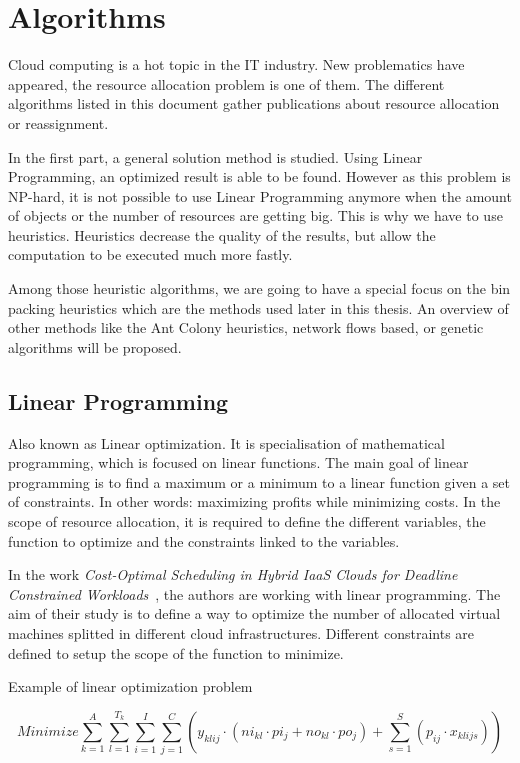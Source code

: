 \section{Algorithms}

Cloud computing is a hot topic in the IT industry.  New problematics have
appeared, the resource allocation problem is one of them. The different
algorithms listed in this document gather publications about resource
allocation or reassignment.

In the first part, a general solution method is studied. Using Linear
Programming, an optimized result is able to be found. However as this problem
is NP-hard, it is not possible to use Linear Programming anymore when the
amount of objects or the number of resources are getting big. This is why we
have to use heuristics. Heuristics decrease the quality of the results, but
allow the computation to be executed much more fastly.

Among those heuristic algorithms, we are going to have a special focus on the
bin packing heuristics which are the methods used later in this thesis. An
overview of other methods like the Ant Colony heuristics, network flows
based, or genetic algorithms will be proposed.

\subsection{Linear Programming}

Also known as Linear optimization. It is specialisation of mathematical
programming, which is focused on linear functions. The main goal of linear
programming is to find a maximum or a minimum to a linear function given a set
of constraints. In other words: maximizing profits while minimizing costs. In
the scope of resource allocation, it is required to define the different
variables, the function to optimize and the constraints linked to the
variables.

In the work \textit{Cost-Optimal Scheduling in Hybrid IaaS Clouds for Deadline
Constrained Workloads}~\cite{allocationHybrid}, the authors are working with
linear programming. The aim of their study is to define a way to optimize the
number of allocated virtual machines splitted in different cloud
infrastructures. Different constraints are defined to setup the scope of the
function to minimize.

\begin{figequation}
	\caption{Example of linear optimization problem}
	\[
		Minimize
		\sum_{k=1}^A \sum_{l=1}^{T_k} \sum_{i=1}^I \sum_{j=1}^C ( y_{klij} \cdot (ni_{kl} \cdot {pi_j} + no_{kl} \cdot po_j) + \sum_{s=1}^S ( p_{ij} \cdot x_{klijs} ))
	\]
\end{figequation}


